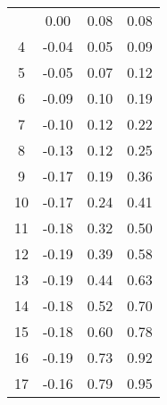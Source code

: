 \begin{longtable}[c]{cccc}
	\endlastfoot
	3                        & 0.00                                    & 0.08                                    & 0.08                       \\
	4                        & -0.04                                   & 0.05                                    & 0.09                       \\
	5                        & -0.05                                   & 0.07                                    & 0.12                       \\
	6                        & -0.09                                   & 0.10                                    & 0.19                       \\
	7                        & -0.10                                   & 0.12                                    & 0.22                       \\
	8                        & -0.13                                   & 0.12                                    & 0.25                       \\
	9                        & -0.17                                   & 0.19                                    & 0.36                       \\
	10                       & -0.17                                   & 0.24                                    & 0.41                       \\
	11                       & -0.18                                   & 0.32                                    & 0.50                       \\
	12                       & -0.19                                   & 0.39                                    & 0.58                       \\
	13                       & -0.19                                   & 0.44                                    & 0.63                       \\
	14                       & -0.18                                   & 0.52                                    & 0.70                       \\
	15                       & -0.18                                   & 0.60                                    & 0.78                       \\
	16                       & -0.19                                   & 0.73                                    & 0.92                       \\
	17                       & -0.16                                   & 0.79                                    & 0.95                       \\

\end{longtable}

